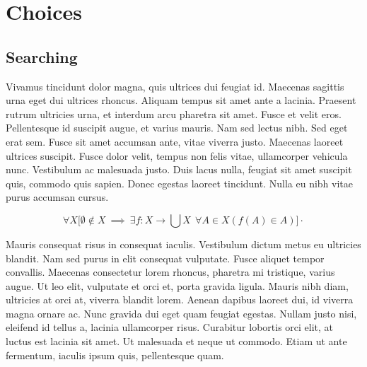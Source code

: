 \chapter{Choices}

\section{Searching}

Vivamus tincidunt dolor magna, quis ultrices dui feugiat id. Maecenas sagittis urna eget dui ultrices rhoncus. Aliquam tempus sit amet ante a lacinia. Praesent rutrum ultricies urna, et interdum arcu pharetra sit amet. Fusce et velit eros. Pellentesque id suscipit augue, et varius mauris. Nam sed lectus nibh. Sed eget erat sem. Fusce sit amet accumsan ante, vitae viverra justo. Maecenas laoreet ultrices suscipit. Fusce dolor velit, tempus non felis vitae, ullamcorper vehicula nunc. Vestibulum ac malesuada justo. Duis lacus nulla, feugiat sit amet suscipit quis, commodo quis sapien. Donec egestas laoreet tincidunt. Nulla eu nibh vitae purus accumsan cursus.

\begin{center}
  \large
  \begin{equation}
    \forall X
    \biggl[\emptyset \not\in X \: \implies \: \exists f:
    X \rightarrow \bigcup X \:\: \forall A
    \in X \left(f\left(A\right) \in A \right)
    \biggr]
    \cdot
  \end{equation}
\end{center}

Mauris consequat risus in consequat iaculis. Vestibulum dictum metus eu ultricies blandit. Nam sed purus in elit consequat vulputate. Fusce aliquet tempor convallis. Maecenas consectetur lorem rhoncus, pharetra mi tristique, varius augue. Ut leo elit, vulputate et orci et, porta gravida ligula. Mauris nibh diam, ultricies at orci at, viverra blandit lorem. Aenean dapibus laoreet dui, id viverra magna ornare ac. Nunc gravida dui eget quam feugiat egestas. Nullam justo nisi, eleifend id tellus a, lacinia ullamcorper risus. Curabitur lobortis orci elit, at luctus est lacinia sit amet. Ut malesuada et neque ut commodo. Etiam ut ante fermentum, iaculis ipsum quis, pellentesque quam.

